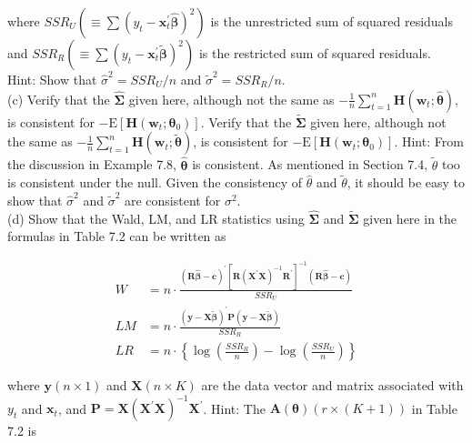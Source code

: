 \documentclass[10pt]{article}
\begin{document}
where $S S R_{U}\left(\equiv \sum\left(y_{t}-\mathbf{x}_{t}^{\prime} \widehat{\boldsymbol{\beta}}\right)^{2}\right)$ is the unrestricted sum of squared residuals and $S S R_{R}\left(\equiv \sum\left(y_{t}-\mathbf{x}_{t}^{\prime} \tilde{\boldsymbol{\beta}}\right)^{2}\right)$ is the restricted sum of squared residuals.\\
Hint: Show that $\hat{\sigma}^{2}=S S R_{U} / n$ and $\tilde{\sigma}^{2}=S S R_{R} / n$.\\
(c) Verify that the $\widehat{\mathbf{\Sigma}}$ given here, although not the same as $-\frac{1}{n} \sum_{t=1}^{n} \mathbf{H}\left(\mathbf{w}_{t} ; \hat{\boldsymbol{\theta}}\right)$, is consistent for $-\mathrm{E}\left[\mathbf{H}\left(\mathbf{w}_{t} ; \boldsymbol{\theta}_{0}\right)\right]$. Verify that the $\tilde{\boldsymbol{\Sigma}}$ given here, although not the same as $-\frac{1}{n} \sum_{t=1}^{n} \mathbf{H}\left(\mathbf{w}_{t} ; \tilde{\boldsymbol{\theta}}\right)$, is consistent for $-\mathrm{E}\left[\mathbf{H}\left(\mathbf{w}_{t} ; \boldsymbol{\theta}_{0}\right)\right]$. Hint: From the discussion in Example 7.8, $\hat{\boldsymbol{\theta}}$ is consistent. As mentioned in Section 7.4, $\tilde{\theta}$ too is consistent under the null. Given the consistency of $\hat{\theta}$ and $\tilde{\theta}$, it should be easy to show that $\hat{\sigma}^{2}$ and $\tilde{\sigma}^{2}$ are consistent for $\sigma^{2}$.\\
(d) Show that the Wald, LM, and LR statistics using $\widehat{\boldsymbol{\Sigma}}$ and $\widetilde{\boldsymbol{\Sigma}}$ given here in the formulas in Table 7.2 can be written as

$$
\begin{aligned}
W & =n \cdot \frac{(\mathbf{R} \widehat{\boldsymbol{\beta}}-\mathbf{c})^{\prime}\left[\mathbf{R}\left(\mathbf{X}^{\prime} \mathbf{X}\right)^{-1} \mathbf{R}^{\prime}\right]^{-1}(\mathbf{R} \widehat{\boldsymbol{\beta}}-\mathbf{c})}{S S R_{U}} \\
L M & =n \cdot \frac{(\mathbf{y}-\mathbf{X} \tilde{\boldsymbol{\beta}})^{\prime} \mathbf{P}(\mathbf{y}-\mathbf{X} \tilde{\boldsymbol{\beta}})}{S S R_{R}} \\
L R & =n \cdot\left\{\log \left(\frac{S S R_{R}}{n}\right)-\log \left(\frac{S S R_{U}}{n}\right)\right\}
\end{aligned}
$$

where $\mathbf{y}(n \times 1)$ and $\mathbf{X}(n \times K)$ are the data vector and matrix associated with $y_{t}$ and $\mathbf{x}_{t}$, and $\mathbf{P}=\mathbf{X}\left(\mathbf{X}^{\prime} \mathbf{X}\right)^{-1} \mathbf{X}^{\prime}$. Hint: The $\mathbf{A}(\boldsymbol{\theta})(r \times(K+1))$ in Table 7.2 is
\end{document}
